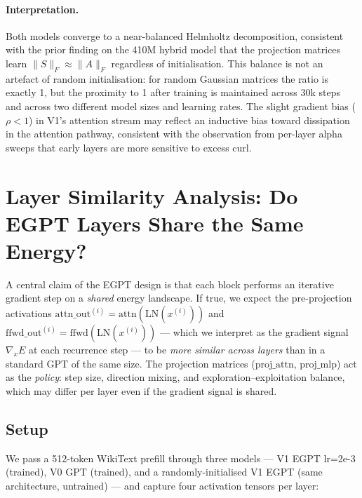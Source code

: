 \documentclass[11pt,a4paper]{article}
\begin{document}
\paragraph{Interpretation.}
Both models converge to a near-balanced Helmholtz decomposition, consistent with the
prior finding on the 410M hybrid model that the projection matrices learn
$\|S\|_F \approx \|A\|_F$ regardless of initialisation.
This balance is not an artefact of random initialisation: for random Gaussian matrices
the ratio is exactly 1, but the proximity to 1 after training is maintained across 30k
steps and across two different model sizes and learning rates.
The slight gradient bias ($\rho < 1$) in V1's attention stream may reflect an inductive
bias toward dissipation in the attention pathway, consistent with the observation from
per-layer alpha sweeps that early layers are more sensitive to excess curl.

\section{Layer Similarity Analysis: Do EGPT Layers Share the Same Energy?}

A central claim of the EGPT design is that each block performs an iterative
gradient step on a \emph{shared} energy landscape.
If true, we expect the pre-projection activations
$\mathrm{attn\_out}^{(i)} = \mathrm{attn}(\mathrm{LN}(x^{(i)}))$ and
$\mathrm{ffwd\_out}^{(i)} = \mathrm{ffwd}(\mathrm{LN}(x^{(i)}))$
--- which we interpret as the gradient signal $\nabla_x E$ at each recurrence step ---
to be \emph{more similar across layers} than in a standard GPT of the same size.
The projection matrices ($\mathrm{proj\_attn}$, $\mathrm{proj\_mlp}$) act as the
\emph{policy}: step size, direction mixing, and exploration--exploitation balance,
which may differ per layer even if the gradient signal is shared.

\subsection{Setup}

We pass a 512-token WikiText prefill through three models ---
V1 EGPT lr=2e-3 (trained), V0 GPT (trained), and a randomly-initialised V1 EGPT
(same architecture, untrained) --- and capture four activation tensors per layer:
\end{document}
